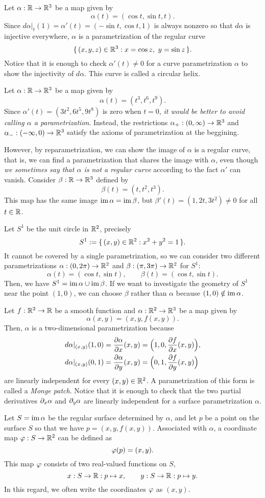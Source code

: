 \documentclass{../exp}
\def\a{\alpha}
\begin{document}
\begin{ex}
Let $\a:\R\to\R^3$ be a map given by
\[\a(t)=(\cos t,\sin t, t).\]
Since $d\a|_t(1)=\a'(t)=(-\sin t,\cos t,1)$ is always nonzero so that $d\a$ is injective everywhere, $\a$ is a parametrization of the regular curve
\[\{\,(x,y,z)\in\mathbb{R}^3:x=\cos z,\ y=\sin z\,\}.\]
Notice that it is enough to check $\a'(t)\ne0$ for a curve parametrization $\a$ to show the injectivity of $d\a$.
This curve is called a circular helix.
\end{ex}
\begin{ex}
Let $\a:\R\to\R^3$ be a map given by
\[\a(t)=(t^3,t^6,t^9).\]
Since $\a'(t)=(3t^2,6t^5,9t^8)$ is zero when $t=0$, \emph{it would be better to avoid calling $\a$ a parametrization}.
Instead, the restrictions $\a_+:(0,\infty)\to\R^3$ and $\a_-:(-\infty,0)\to\R^3$ satisfy the axioms of parametrization at the beggining.

However, by reparametrization, we can show the image of $\a$ is a regular curve, that is, we can find a parametrization that shares the image with $\a$, even though \emph{we sometimes say that $\a$ is not a regular curve} according to the fact $\a'$ can vanish.
Consider $\beta:\R\to\R^3$ defined by
\[\beta(t)=(t,t^2,t^3).\]
This map has the same image $\im\a=\im\beta$, but $\beta'(t)=(1,2t,3t^2)\ne0$ for all $t\in\mathbb{R}$.
\end{ex}
\begin{ex}
Let $S^1$ be the unit circle in $\mathbb{R}^2$, precisely
\[S^1:=\{\,(x,y)\in\mathbb{R}^2:x^2+y^2=1\,\}.\]
It cannot be covered by a single parametrization, so we can consider two different parametrizations $\a:(0,2\pi)\to\R^2$ and $\beta:(\pi,3\pi)\to\R^2$ for $S^1$:
\[\alpha(t)=(\cos t,\sin t),\qquad\beta(t)=(\cos t,\sin t).\]
Then, we have $S^1=\im\a\cup\im\beta$.
If we want to investigate the geometry of $S^1$ near the point $(1,0)$, we can choose $\beta$ rather than $\a$ because $(1,0)\notin\im\a$.
\end{ex}
\begin{ex}
Let $f:\R^2\to\R$ be a smooth function and $\a:\R^2\to\R^3$ be a map given by
\[\a(x,y)=(x,y,f(x,y)).\]
Then, $\a$ is a two-dimensional parametrization because
\begin{align*}
d\a|_{(x,y)}(1,0)&=\pd{\a}{x}(x,y)=\Bigl(1,0,\pd{f}{x}(x,y)\Bigr),\\
d\a|_{(x,y)}(0,1)&=\pd{\a}{y}(x,y)=\Bigl(0,1,\pd{f}{y}(x,y)\Bigr)
\end{align*}
are linearly independent for every $(x,y)\in\mathbb{R}^2$.
A parametrization of this form is called a \emph{Monge patch}.
Notice that it is enough to check that the two partial derivatives $\pd_x\a$ and $\pd_y\a$ are linearly independent for a surface parametrization $\a$.

Let $S=\im\a$ be the regular surface determined by $\a$, and let $p$ be a point on the surface $S$ so that we have $p=(x,y,f(x,y))$.
Associated with $\a$, a coordinate map $\f:S\to\R^2$ can be defined as
\[\varphi(p)=(x,y).\]
This map $\varphi$ consists of two real-valued functions on $S$,
\[x:S\to\R:p\mapsto x,\qquad y:S\to\R:p\mapsto y.\]
In this regard, we often write the coordinates $\varphi$ as $(x,y)$.
\end{ex}
\end{document}

